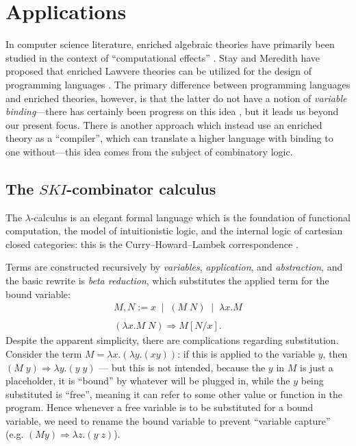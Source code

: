 \documentclass{amsart}
\theoremstyle{definition}
\begin{document}
\section{Applications}
\label{sec:applications}

In computer science literature, enriched algebraic theories have primarily been studied in the context of ``computational effects'' \cite{compeffects}.   Stay and Meredith have proposed that enriched Lawvere theories can be utilized for the design of programming languages \cite{ladl}. The primary difference between programming languages and enriched theories, however, is that the latter do not have a notion of \textit{variable binding}---there has certainly been progress on this idea \cite{fiore}, but it leads us beyond our present focus. There is another approach which instead use an enriched theory as a ``compiler'', which can translate a higher language with binding to one without---this idea comes from the subject of combinatory logic.

\subsection{The $SKI$-combinator calculus}
\label{ssec:SKI}

The $\lambda$-calculus is an elegant formal language which is the foundation of functional computation, the model of intuitionistic logic, and the internal logic of cartesian closed categories: this is the Curry--Howard--Lambek correspondence \cite{baezstay}.

Terms are constructed recursively by \textit{variables}, \textit{application}, and \textit{abstraction}, and the basic rewrite is \textit{beta reduction}, which substitutes the applied term for the bound variable: 
\[ \begin{array}{l}
     M,N := x \;\; | \;\; (M\; N) \;\; | \;\; \lambda x.M\\\\
     (\lambda x.M\; N) \Rightarrow M[N/x].
     \end{array}\]
Despite the apparent simplicity, there are complications regarding substitution. Consider the term $M = \lambda x.(\lambda y.(xy))$: if this is applied to the variable $y$, then $(M\; y) \Rightarrow \lambda y.(y\; y)$ --- but this is not intended, because the $y$ in $M$ is just a placeholder, it is ``bound'' by whatever will be plugged in, while the $y$ being substituted is ``free'', meaning it can refer to some other value or function in the program. Hence whenever a free variable is to be substituted for a bound variable, we need to rename the bound variable to prevent ``variable capture'' (e.g. $(M y) \Rightarrow \lambda z.(y\; z)$).
\end{document}
